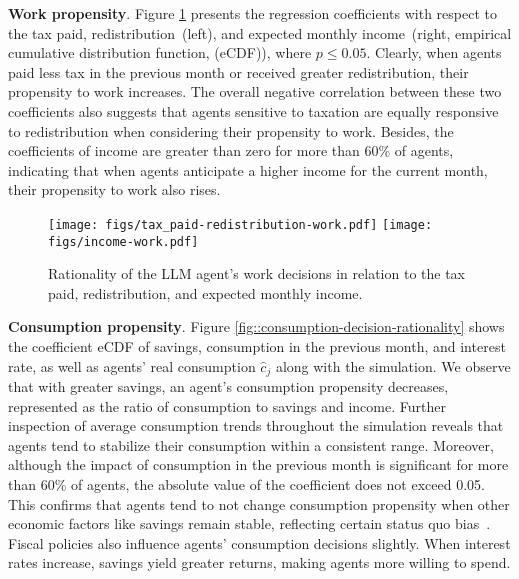 \textbf{Work propensity}. Figure \ref{fig::work-decision-rationality} presents the regression coefficients with respect to the tax paid, redistribution~(left), and expected monthly income~(right, empirical cumulative distribution function, (eCDF)), where $p\leq 0.05$. Clearly, when agents paid less tax in the previous month or received greater redistribution, their propensity to work increases. The overall negative correlation between these two coefficients also suggests that agents sensitive to taxation are equally responsive to redistribution when considering their propensity to work. Besides, the coefficients of income are greater than zero for more than 60\% of agents, indicating that when agents anticipate a higher income for the current month, their propensity to work also rises.
\begin{figure}[t]
\centering
\texttt{[image: figs/tax\_paid-redistribution-work.pdf]}
\texttt{[image: figs/income-work.pdf]}
\caption{Rationality of the LLM agent's work decisions in relation to the tax paid, redistribution, and expected monthly income.} \label{fig::work-decision-rationality}
\end{figure}

\textbf{Consumption propensity}. Figure \ref{fig::consumption-decision-rationality} shows the coefficient eCDF of savings, consumption in the previous month, and interest rate, as well as agents' real consumption $\hat{c}_j$ along with the simulation. We observe that with greater savings, an agent's consumption propensity decreases, represented as the ratio of consumption to savings and income. Further inspection of average consumption trends throughout the simulation reveals that agents tend to stabilize their consumption within a consistent range. Moreover, although the impact of consumption in the previous month is significant for more than 60\% of agents, the absolute value of the coefficient does not exceed 0.05. This confirms that agents tend to not change consumption propensity when other economic factors like savings remain stable, reflecting certain status quo bias~\cite{kahneman1991endowment}. Fiscal policies also influence agents' consumption decisions slightly. When interest rates increase, savings yield greater returns, making agents more willing to spend. 

